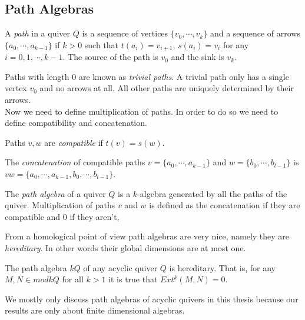 \subsection{Path Algebras}
\begin{definition}
A \textit{path} in a quiver $Q$ is a sequence of vertices $\{v_0,\cdots, v_k\}$ and a sequence of arrows $\{a_0,\cdots, a_{k-1}\}$ if $k>0$ such that $t(a_i) = v_{i+1}$, $ s(a_i) = v_i$ for any $i = 0,1,\cdots, k-1$. The source of the path is $v_0$ and the sink is $v_k$.
\end{definition}
\indent Paths with length 0 are known as \textit{trivial paths}. A trivial path only has a single vertex $v_0$ and no arrows at all. All other paths are uniquely determined by their arrows.\\
\indent Now we need to define multiplication of paths. In order to do so we need to define compatibility and concatenation.\\
\begin{definition}
Paths $v,w$ are \textit{compatible} if $t(v) = s(w)$.
\end{definition}
\begin{definition}
The \textit{concatenation} of compatible paths $v = \{a_0,\cdots, a_{k-1}\}$ and $w = \{b_0,\cdots, b_{l-1}\}$ is  $vw = \{a_0,\cdots, a_{k-1}, b_0,\cdots, b_{l-1}\}$.
\end{definition}
\begin{definition}
The \textit{path algebra} of a quiver $Q$ is a $k$-algebra generated by all the paths of the quiver. Multiplication of paths $v$ and $w$ is defined as the concatenation if they are compatible and 0 if they aren't, 
\end{definition}
\indent From a homological point of view path algebras are very nice, namely they are \textit{hereditary}. In other words their global dimensions are at most one.
\begin{theorem}
The path algebra $kQ$ of any acyclic quiver $Q$ is hereditary. That is, for any $M,N\in mod kQ$ for all $k>1$ it is true that $Ext^k(M,N)=0$.
\end{theorem}
\indent We mostly only discuss path algebras of acyclic quivers in this thesis because our results are only about finite dimensional algebras.\\
